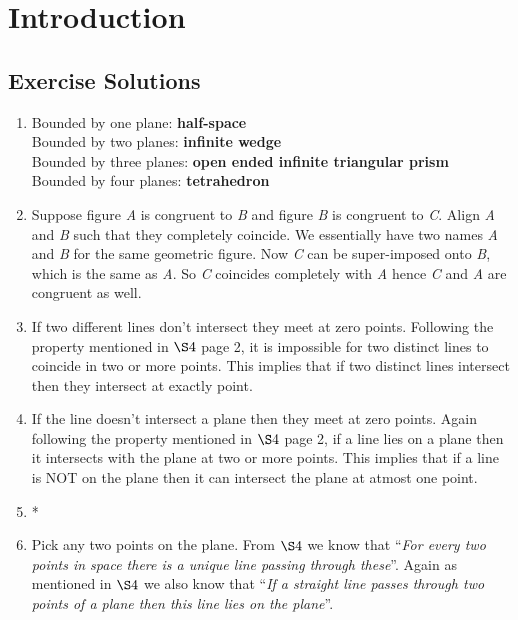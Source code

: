 \chapter{Introduction}

\section*{Exercise Solutions}

\begin{enumerate}
	\item Bounded by one plane: \textbf{half-space} \\
	Bounded by two planes: \textbf{infinite wedge} \\
	Bounded by three planes: \textbf{open ended infinite triangular prism} \\
	Bounded by four planes: \textbf{tetrahedron}
	
	\item Suppose figure \textit{A} is congruent to \textit{B} and figure \textit{B} is congruent to \textit{C}. Align \textit{A} and \textit{B} such that they completely coincide. We essentially have two names \textit{A} and \textit{B} for the same geometric figure. Now \textit{C} can be super-imposed onto \textit{B}, which is the same as \textit{A}. So \textit{C} coincides completely with \textit{A} hence \textit{C} and \textit{A} are congruent as well.
	
	\item If two different lines don't intersect they meet at zero points. Following the property mentioned in $\S4$ page 2, it is impossible for two distinct lines to coincide in two or more points. This implies that if two distinct lines intersect then they intersect at exactly point.
	
	\item If the line doesn't intersect a plane then they meet at zero points. Again following the property mentioned in $\S4$ page 2, if a line lies on a plane then it intersects with the plane at two or more points. This implies that if a line is NOT on the plane then it can intersect the plane at atmost one point.
		
	\item *
	
	\item Pick any two points on the plane. From $\S4$ we know that ``\textit{For every two points in space there is a unique line passing through these}''. Again as mentioned in $\S4$ we also know that ``\textit{If a straight line passes through two points of a plane then this line lies on the plane}''. 
	

\end{enumerate}
